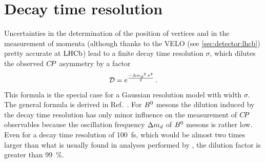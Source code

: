\section{Decay time resolution}
\label{sec:dataanalysis::resolution}

Uncertainties in the determination of the position of vertices and in the
measurement of momenta (although thanks to the VELO (see
\cref{sec:detector:lhcb}) pretty accurate  at $\mbox{LHCb}$) lead to a finite decay
time resolution $\sigma$, which dilutes the observed ${C\!P}$ asymmetry by a
factor
\begin{align}
  \mathcal{D} = e^{\frac{-{\Delta m_{{d}}}^2\,\sigma^2}{2}} \, .
\end{align}
This formula is the special case for a Gaussian resolution model with width
$\sigma$. The general formula is derived in
Ref.~\cite{ResolutionDilutionFactor}. For ${{B}^0}$ mesons the dilution induced by
the decay time resolution has only minor influence on the measurement of ${C\!P}$
observables because the oscillation frequency ${\Delta m_{{d}}}$ of ${{B}^0}$ mesons is rather
low. Even for a decay time resolution of \SI{100}{\fs}, which would be almost
two times larger than what is usually found in analyses performed by \lhcb,
the dilution factor is greater than \SI{99}{\percent}.